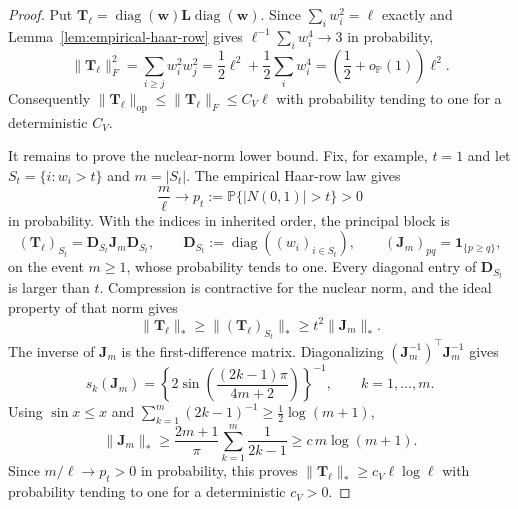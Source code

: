 \documentclass{article}
\newcommand{\Prob}{\mathbb{P}}
\newcommand{\diag}{\operatorname{diag}}
\newcommand{\op}{\operatorname{op}}
\newcommand{\one}{\mathbf{1}}
\newcommand{\bD}{\mathbf{D}}
\newcommand{\bL}{\mathbf{L}}
\newcommand{\bT}{\mathbf{T}}
\newcommand{\bw}{\mathbf{w}}
\theoremstyle{definition}
\theoremstyle{remark}
\begin{document}
\begin{proof}
Put $\bT_\ell=\diag(\bw)\bL\diag(\bw)$.  Since
$\sum_iw_i^2=\ell$ exactly and Lemma~\ref{lem:empirical-haar-row} gives
$\ell^{-1}\sum_iw_i^4\to3$ in probability,
\[
    \|\bT_\ell\|_F^2
    =
    \sum_{i\geq j}w_i^2w_j^2
    =
    \frac12\ell^2+\frac12\sum_iw_i^4
    =
    \left(\frac12+o_{\Prob}(1)\right)\ell^2.
\]
Consequently $\|\bT_\ell\|_{\op}\leq\|\bT_\ell\|_F\leq C_V\ell$
with probability tending to one for a deterministic $C_V$.

It remains to prove the nuclear-norm lower bound.  Fix, for example, $t=1$ and let
$S_t=\{i:w_i>t\}$ and $m=|S_t|$.  The empirical Haar-row law gives
\[
    \frac{m}{\ell}\longrightarrow
    p_t:=\Prob\{|N(0,1)|>t\}>0
\]
in probability.  With the indices in inherited order, the principal block is
\[
    (\bT_\ell)_{S_t}=\bD_{S_t}\mathbf J_m\bD_{S_t},
    \qquad
    \bD_{S_t}:=\diag((w_i)_{i\in S_t}),
    \qquad
    (\mathbf J_m)_{pq}=\one_{\{p\geq q\}},
\]
on the event $m\geq1$, whose probability tends to one.  Every diagonal entry
of $\bD_{S_t}$ is larger than $t$.  Compression is contractive for the nuclear
norm, and the ideal property of that norm gives
\[
    \|\bT_\ell\|_*
    \geq
    \|(\bT_\ell)_{S_t}\|_*
    \geq
    t^2\|\mathbf J_m\|_*.
\]
The inverse of $\mathbf J_m$ is the first-difference matrix.  Diagonalizing
$(\mathbf J_m^{-1})^\top\mathbf J_m^{-1}$ gives
\[
    s_k(\mathbf J_m)
    =
    \left\{
        2\sin\left(\frac{(2k-1)\pi}{4m+2}\right)
    \right\}^{-1},
    \qquad k=1,\ldots,m.
\]
Using $\sin x\leq x$ and
$\sum_{k=1}^m(2k-1)^{-1}\geq\frac12\log(m+1)$,
\[
    \|\mathbf J_m\|_*
    \geq
    \frac{2m+1}{\pi}
    \sum_{k=1}^m\frac{1}{2k-1}
    \geq
    c\,m\log(m+1).
\]
Since $m/\ell\to p_t>0$ in probability, this proves
$\|\bT_\ell\|_*\geq c_V\ell\log\ell$ with probability tending to one for a
deterministic $c_V>0$.
\end{proof}
\end{document}
